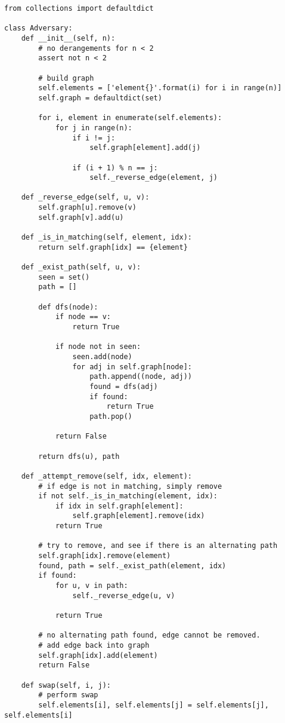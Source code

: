 \documentclass{article}
\begin{document}
\begin{verbatim}
from collections import defaultdict

class Adversary:
    def __init__(self, n):
        # no derangements for n < 2
        assert not n < 2

        # build graph
        self.elements = ['element{}'.format(i) for i in range(n)]
        self.graph = defaultdict(set)

        for i, element in enumerate(self.elements):
            for j in range(n):
                if i != j:
                    self.graph[element].add(j)

                if (i + 1) % n == j:
                    self._reverse_edge(element, j)

    def _reverse_edge(self, u, v):
        self.graph[u].remove(v)
        self.graph[v].add(u)

    def _is_in_matching(self, element, idx):
        return self.graph[idx] == {element}

    def _exist_path(self, u, v):
        seen = set()
        path = []

        def dfs(node):
            if node == v:
                return True

            if node not in seen:
                seen.add(node)
                for adj in self.graph[node]:
                    path.append((node, adj))
                    found = dfs(adj)
                    if found:
                        return True
                    path.pop()

            return False

        return dfs(u), path

    def _attempt_remove(self, idx, element):
        # if edge is not in matching, simply remove
        if not self._is_in_matching(element, idx):
            if idx in self.graph[element]:
                self.graph[element].remove(idx)
            return True

        # try to remove, and see if there is an alternating path
        self.graph[idx].remove(element)
        found, path = self._exist_path(element, idx)
        if found:
            for u, v in path:
                self._reverse_edge(u, v)

            return True

        # no alternating path found, edge cannot be removed.
        # add edge back into graph
        self.graph[idx].add(element)
        return False

    def swap(self, i, j):
        # perform swap
        self.elements[i], self.elements[j] = self.elements[j], self.elements[i]


\end{verbatim}
\end{document}
